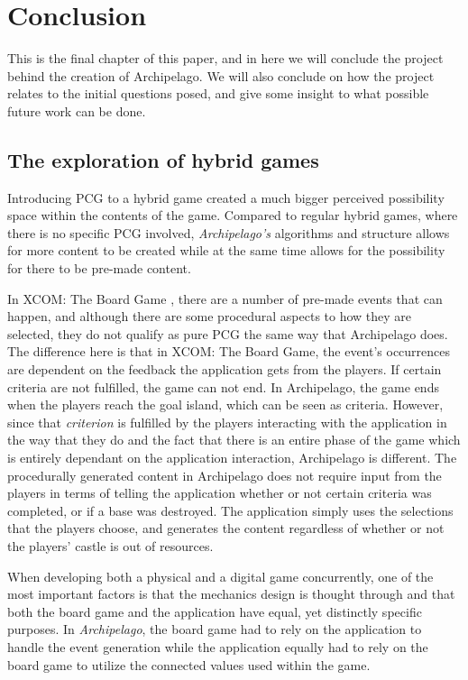 \chapter{Conclusion}
This is the final chapter of this paper, and in here we will conclude the project behind the creation of Archipelago. We will also conclude on how the project relates to the initial questions posed, and give some insight to what possible future work can be done.


\section{The exploration of hybrid games}
Introducing PCG to a hybrid game created a much bigger perceived possibility space within the contents of the game. Compared to regular hybrid games, where there is no specific PCG involved, \textit{Archipelago's} algorithms and structure allows for more content to be created while at the same time allows for the possibility for there to be pre-made content. 

In XCOM: The Board Game \cite{game:xcomtbg}, there are a number of pre-made events that can happen, and although there are some procedural aspects to how they are selected, they do not qualify as pure PCG the same way that Archipelago does. The difference here is that in XCOM: The Board Game, the event's occurrences are dependent on the feedback the application gets from the players. If certain criteria are not fulfilled, the game can not end. In Archipelago, the game ends when the players reach the goal island, which can be seen as criteria. However, since that \textit{criterion} is fulfilled by the players interacting with the application in the way that they do and the fact that there is an entire phase of the game which is entirely dependant on the application interaction, Archipelago is different. The procedurally generated content in Archipelago does not require input from the players in terms of telling the application whether or not certain criteria was completed, or if a base was destroyed. The application simply uses the selections that the players choose, and generates the content regardless of whether or not the players' castle is out of resources.

When developing both a physical and a digital game concurrently, one of the most important factors is that the mechanics design is thought through and that both the board game and the application have equal, yet distinctly specific purposes. In \textit{Archipelago}, the board game had to rely on the application to handle the event generation while the application equally had to rely on the board game to utilize the connected values used within the game. 

